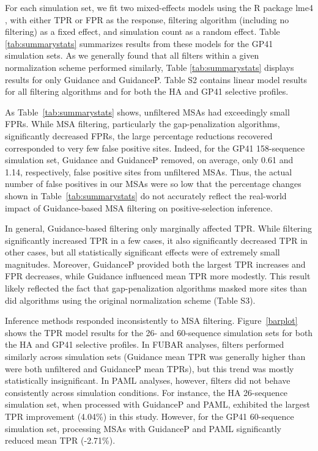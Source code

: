 \documentclass[11pt]{article}
\begin{document}
For each simulation set, we fit two mixed-effects models using the R package lme4 \citep{Bates2012}, with either TPR or FPR as the response, filtering algorithm (including no filtering) as a fixed effect, and simulation count as a random effect. Table \ref{tab:summarystats} summarizes results from these models for the GP41 simulation sets. As we generally found that all filters within a given normalization scheme performed similarly, Table \ref{tab:summarystats} displays results for only Guidance and GuidanceP. Table S2 contains linear model results for all filtering algorithms and for both the HA and GP41 selective profiles.

As Table~\ref{tab:summarystats} shows, unfiltered MSAs had exceedingly small FPRs. While MSA filtering, particularly the gap-penalization algorithms, significantly decreased FPRs, the large percentage reductions recovered corresponded to very few false positive sites. Indeed, for the GP41 158-sequence simulation set, Guidance and GuidanceP removed, on average, only 0.61 and 1.14, respectively, false positive sites from unfiltered MSAs. Thus, the actual number of false positives in our MSAs were so low that the percentage changes shown in Table~\ref{tab:summarystats} do not accurately reflect the real-world impact of Guidance-based MSA filtering on positive-selection inference.

In general, Guidance-based filtering only marginally affected TPR. While filtering significantly increased TPR in a few cases, it also significantly decreased TPR in other cases, but all statistically significant effects were of extremely small magnitudes. Moreover, GuidanceP provided both the largest TPR increases and FPR decreases, while Guidance influenced mean TPR more modestly. This result likely reflected the fact that gap-penalization algorithms masked more sites than did algorithms using the original normalization scheme (Table S3). 

Inference methods responded inconsistently to MSA filtering. Figure~\ref{barplot} shows the TPR model results for the 26- and 60-sequence simulation sets for both the HA and GP41 selective profiles. In FUBAR analyses, filters performed similarly across simulation sets (Guidance mean TPR was generally higher than were both unfiltered and GuidanceP mean TPRs), but this trend was mostly statistically insignificant. In PAML analyses, however, filters did not behave consistently across simulation conditions. For instance, the HA 26-sequence simulation set, when processed with GuidanceP and PAML, exhibited the largest TPR improvement (4.04\%) in this study. However, for the GP41 60-sequence simulation set, processing MSAs with GuidanceP and PAML significantly reduced mean TPR (-2.71\%).
\end{document}
